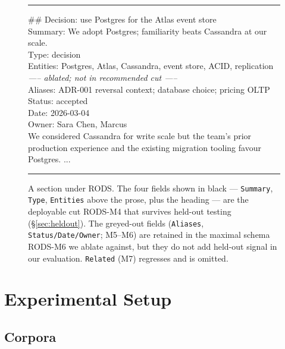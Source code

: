 \documentclass[11pt]{article}
\begin{document}
\begin{figure}[H]
\centering
\begin{minipage}{0.92\linewidth}
\hrule\smallskip
{\ttfamily\small\noindent
\#\# Decision: use Postgres for the Atlas event store \\[2pt]
Summary: We adopt Postgres; familiarity beats Cassandra at our scale.\\
Type: decision\\
Entities: Postgres, Atlas, Cassandra, event store, ACID, replication\\[2pt]
\textcolor{black!50}{\textit{----- ablated; not in recommended cut -----}}\\
\textcolor{black!50}{Aliases: ADR-001 reversal context; database choice; pricing OLTP}\\
\textcolor{black!50}{Status: accepted}\\
\textcolor{black!50}{Date: 2026-03-04}\\
\textcolor{black!50}{Owner: Sara Chen, Marcus}\\[2pt]
We considered Cassandra for write scale but the team's prior\\
production experience and the existing migration tooling favour\\
Postgres. ...
}
\smallskip\hrule
\end{minipage}
\caption{A section under RODS. The four fields shown in black
  --- \texttt{Summary}, \texttt{Type}, \texttt{Entities} above the
  prose, plus the heading --- are the deployable cut RODS-M4 that
  survives held-out testing (\S\ref{sec:heldout}). The greyed-out
  fields (\texttt{Aliases}, \texttt{Status/Date/Owner}; M5--M6) are
  retained in the maximal schema RODS-M6 we ablate against, but they
  do not add held-out signal in our evaluation. \texttt{Related}
  (M7) regresses and is omitted.}
\label{fig:schema}
\end{figure}


\section{Experimental Setup}

\subsection{Corpora}
\end{document}
